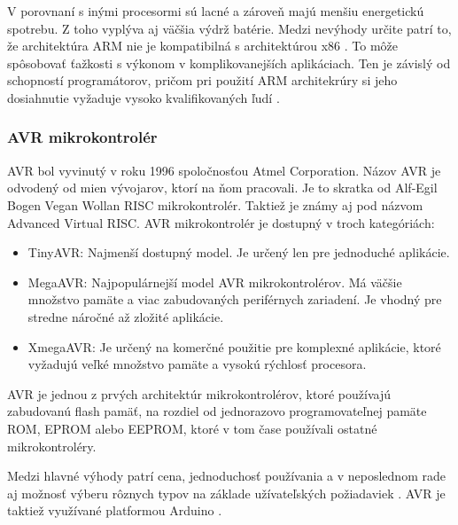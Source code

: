 V porovnaní s inými procesormi sú lacné a zároveň majú menšiu energetickú spotrebu. Z toho vyplýva aj väčšia výdrž batérie.
Medzi nevýhody určite patrí to, že architektúra ARM nie je kompatibilná s architektúrou x86 \cite{shidlingDifferentTypesMicrocontrollers2020}. To môže spôsobovať ťažkosti s výkonom
v komplikovanejších aplikáciach. Ten je závislý od schopností programátorov, pričom pri použití ARM architekrúry si jeho dosiahnutie vyžaduje vysoko kvalifikovaných ľudí \cite{WhatARMProcessor2022}.

\subsubsection{AVR mikrokontrolér}
\noindent \par
AVR bol vyvinutý v roku 1996 spoločnosťou Atmel Corporation. Názov AVR je odvodený od mien vývojarov, ktorí na ňom pracovali.
Je to skratka od  Alf-Egil Bogen Vegan Wollan RISC mikrokontrolér.
Taktiež je známy aj pod názvom Advanced Virtual RISC. AVR mikrokontrolér je dostupný v troch kategóriách:
\begin{itemize}
    \item TinyAVR: Najmenší dostupný model. Je určený len pre jednoduché aplikácie.
    \item MegaAVR: Najpopulárnejší model AVR mikrokontrolérov. Má väčšie množstvo pamäte a viac zabudovaných periférnych zariadení. Je vhodný pre stredne náročné až zložité aplikácie.
    \item XmegaAVR: Je určený na komerčné použitie pre komplexné aplikácie, ktoré vyžadujú veľké množstvo pamäte a vysokú rýchlosť procesora.
\end{itemize}

AVR je jednou z prvých architektúr mikrokontrolérov, ktoré používajú zabudovanú flash pamäť, na rozdiel od jednorazovo programovateľnej pamäte ROM,  \acrshort{EPROM}  alebo  \acrshort{EEPROM}, ktoré v tom čase používali ostatné mikrokontroléry.
\par
Medzi hlavné výhody patrí cena, jednoduchosť používania a v neposlednom rade aj možnosť výberu rôznych typov na základe užívateľských požiadaviek \cite{shidlingDifferentTypesMicrocontrollers2020}. AVR je taktiež využívané platformou Arduino \cite{AVRVsArduinoWhich2017}.




